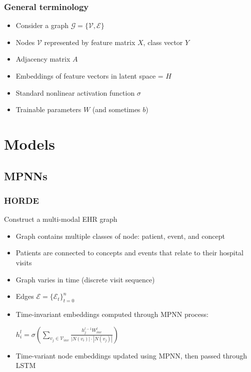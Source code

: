 \documentclass{beamer}
\begin{document}
\begin{frame}
    \frametitle{General terminology}
    
    \begin{itemize}
        \item Consider a graph $\mathcal{G} = \{\mathcal{V},\mathcal{E}\}$
        \item Nodes $\mathcal{V}$ represented by feature matrix $X$, class vector $Y$
        \item Adjacency matrix $A$
        \item Embeddings of feature vectors in latent space = $H$
        \item Standard nonlinear activation function $\sigma$
        \item Trainable parameters $W$ (and sometimes $b$)
    \end{itemize}
    

    \end{frame}
 
 
\section{Models}
    
\subsection{MPNNs}



\begin{frame}
    \frametitle{HORDE}
	Construct a multi-modal EHR graph
	
    \begin{itemize}
        \item Graph contains multiple classes of node: patient, event, and concept
        \item Patients are connected to concepts and events that relate to their hospital visits
        \item Graph varies in time (discrete visit sequence)
        \item Edges $\mathcal{E} = \{\mathcal{E}_t\}_{t=0}^n$
        \item Time-invariant embeddings computed through MPNN process:
        
        \begin{center}
$h_i^l = \sigma(\sum\limits_{v_j \in \mathcal{V}_{inv}} \frac{h_j^{l-1}W^l_{inv}}{|N(v_i)|\cdot |N(v_j)|})$
\end{center}
        \item Time-variant node embeddings updated using MPNN, then passed through LSTM
    \end{itemize}
    

    \end{frame}
    
\end{document}
